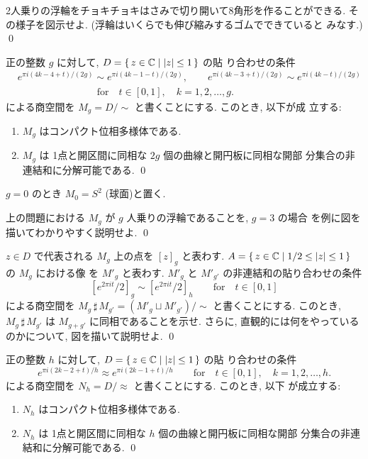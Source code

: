 \documentclass[12pt,twoside]{jarticle}
\def\C{{\Bbb C}} %
\begin{document}
\begin{question}
  2人乗りの浮輪をチョキチョキはさみで切り開いて8角形を作ることができる.
  その様子を図示せよ. (浮輪はいくらでも伸び縮みするゴムでできていると
  みなす.) \qed
\end{question}

\begin{question}\label{q:M_g}
  正の整数 $g$ に対して, $D = \{\, z \in \C \mid |z| \le 1 \,\}$ の貼
  り合わせの条件
  \begin{align*}
    &
    e^{\pi i(4k-4+t  )/(2g)} \sim e^{\pi i(4k-1-t)/(2g)},
    \qquad
    e^{\pi i(4k-3+t)  /(2g)} \sim e^{\pi i(4k-t)  /(2g)}
    \\
    &
    \qquad\qquad\qquad\qquad
    \text{for}\quad
    t \in [0,1],\quad k = 1,2,\dots,g.
  \end{align*}
  による商空間を $M_g = D/{\sim}$ と書くことにする. このとき, 以下が成
  立する:
  \begin{enumerate}
  \item $M_g$ はコンパクト位相多様体である. 
  \item $M_g$ は 1点と開区間に同相な $2g$ 個の曲線と開円板に同相な開部
    分集合の非連結和に分解可能である. \qed
  \end{enumerate}
\end{question}

\noindent $g = 0$ のとき $M_0 = S^2$ (球面)と置く.

\begin{question}
  上の問題における $M_g$ が $g$ 人乗りの浮輪であることを, $g=3$ の場合
  を例に図を描いてわかりやすく説明せよ. \qed
\end{question}

\begin{question}
  $z \in D$ で代表される $M_g$ 上の点を $[z]_g$ と表わす. 
  $A = \{\, z \in \C \mid 1/2 \le |z| \le 1 \,\}$ の $M_g$ における像%
  を $M'_g$ と表わす. $M'_g$ と $M'_{g'}$ の非連結和の貼り合わせの条件
  \[
    [e^{2\pi i t}/2]_g \sim [e^{2\pi i t}/2]_h
    \qquad\text{for}\quad
    t \in [0,1]
  \]
  による商空間を $M_g\,\sharp\,M_{g'} = (M'_g \sqcup M'_{g'})/{\sim}$ %
  と書くことにする. %
  このとき, $M_g\,\sharp\,M_{g'}$ は $M_{g+g'}$ に同相であることを示せ.
  さらに, 直観的には何をやっているのかについて, 図を描いて説明せよ. 
  \qed
\end{question}

\begin{question}\label{q:N_h}
  正の整数 $h$ に対して, $D = \{\, z \in \C \mid |z| \le 1 \,\}$ の貼
  り合わせの条件
  \[
    e^{\pi i(2k-2+t)/h} \approx e^{\pi i (2k-1+t)/h}
    \qquad\text{for}\quad
    t \in [0,1],\quad k = 1,2,\dots,h.
  \]%
  による商空間を $N_h = D/{\approx}$ と書くことにする. このとき, 以下
  が成立する: 
  \begin{enumerate}
  \item $N_h$ はコンパクト位相多様体である. 
  \item $N_h$ は 1点と開区間に同相な $h$ 個の曲線と開円板に同相な開部
    分集合の非連結和に分解可能である. \qed
  \end{enumerate}
\end{question}
\end{document}
